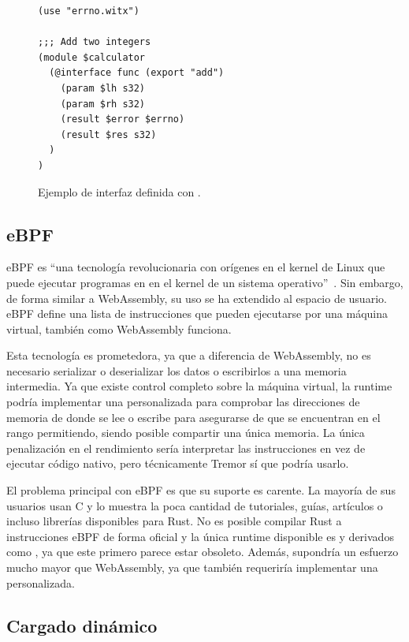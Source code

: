 \begin{figure}
    \centering
    \begin{verbatim}
(use "errno.witx")

;;; Add two integers
(module $calculator
  (@interface func (export "add")
    (param $lh s32)
    (param $rh s32)
    (result $error $errno)
    (result $res s32)
  )
)
    \end{verbatim}
    \caption{Ejemplo de interfaz definida con .}%
    \label{fig:witx_example}
\end{figure}

\subsection{eBPF}

eBPF es ``una tecnología revolucionaria con orígenes en el kernel de Linux que
puede ejecutar programas en \sandbox en el kernel de un sistema
operativo''~\cite{ebpf}. Sin embargo, de forma similar a WebAssembly, su uso se
ha extendido al espacio de usuario. eBPF define una lista de instrucciones que
pueden ejecutarse por una máquina virtual, también como WebAssembly funciona.

Esta tecnología es prometedora, ya que a diferencia de WebAssembly, no es
necesario serializar o deserializar los datos o escribirlos a una memoria
intermedia. Ya que existe control completo sobre la máquina virtual, la runtime
podría implementar una \sandbox personalizada para comprobar las direcciones de
memoria de donde se lee o escribe para asegurarse de que se encuentran en el
rango permitiendo, siendo posible compartir una única memoria. La única
penalización en el rendimiento sería interpretar las instrucciones en vez de
ejecutar código nativo, pero técnicamente Tremor sí que podría usarlo.

El problema principal con eBPF es que su suporte es carente. La mayoría de sus
usuarios usan C y lo muestra la poca cantidad de tutoriales, guías, artículos o
incluso librerías disponibles para Rust. No es posible compilar Rust a
instrucciones eBPF de forma oficial y la única runtime disponible es
 y derivados como , ya que este primero
parece estar obsoleto. Además, supondría un esfuerzo mucho mayor que
WebAssembly, ya que también requeriría implementar una \sandbox personalizada.

\subsection{Cargado dinámico}\label{sec:dynload}

